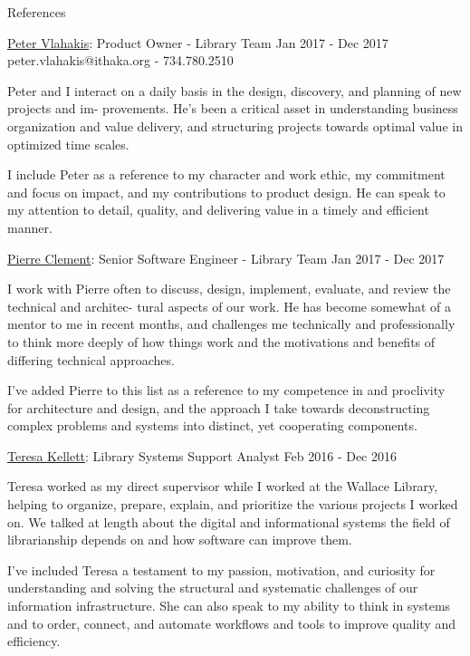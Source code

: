 \documentclass{resume} %
\begin{document}
  \begin{rSection}{References}

    \begin{rSubsection}{\underline{Peter Vlahakis}: Product Owner - Library Team }{ Jan 2017 - Dec 2017 }{peter.vlahakis@ithaka.org - 734.780.2510}

      \item Peter and I interact on a daily basis in the design, discovery, and planning of new projects and im- provements. He’s been a critical asset in understanding business organization and value delivery, and structuring projects towards optimal value in optimized time scales.

      \item I include Peter as a reference to my character and work ethic, my commitment and focus on impact, and my contributions to product design. He can speak to my attention to detail, quality, and delivering value in a timely and efficient manner.

    \end{rSubsection}

    \begin{rSubsection}{\underline{Pierre Clement}: Senior Software Engineer - Library Team }{ Jan 2017 - Dec 2017 }{}

      \item I work with Pierre often to discuss, design, implement, evaluate, and review the technical and architec- tural aspects of our work. He has become somewhat of a mentor to me in recent months, and challenges me technically and professionally to think more deeply of how things work and the motivations and benefits of differing technical approaches.

      \item I’ve added Pierre to this list as a reference to my competence in and proclivity for architecture and design, and the approach I take towards deconstructing complex problems and systems into distinct, yet cooperating components.

    \end{rSubsection}

    \begin{rSubsection}{\underline{Teresa Kellett}: Library Systems Support Analyst }{ Feb 2016 - Dec 2016 }{}

      \item Teresa worked as my direct supervisor while I worked at the Wallace Library, helping to organize, prepare, explain, and prioritize the various projects I worked on. We talked at length about the digital and informational systems the field of librarianship depends on and how software can improve them.

      \item I've included Teresa a testament to my passion, motivation, and curiosity for understanding and solving the structural and systematic challenges of our information infrastructure. She can also speak to my ability to think in systems and to order, connect, and automate workflows and tools to improve quality and efficiency.

    \end{rSubsection}

  \end{rSection}
\end{document}

